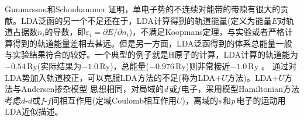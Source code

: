 {Gunnarsson和Schonhammer%
证明，单电子势的不连续对能带的带隙有很大的贡献。LDA泛函的另一个不足还在于，LDA计算得到的轨道能量(定义为能量$E$对轨道占据数$n_i$的导数，即$\varepsilon_i=\partial E/\partial n_i$)，不满足\textrm{Koopmans}定理\cite{Physica1-104_1933}，与实验或者严格计算得到的轨道能量差相去甚远。但是另一方面，LDA泛函得到的体系总能量一般与实验结果符合的较好。一个典型的例子就是\textrm{H}原子的计算，LDA计算的轨道能为$-0.54\,\mathrm{Ry}$(实际结果为$-1.0\,\mathrm{Ry}$)，总能量($-0.976\,\mathrm{Ry}$)则非常接近$-1.0\,\mathrm{Ry}$%
。%
通过对LDA势加入轨道校正，可以克服LDA方法的不足(称为LDA+$U$方法)。LDA+$U$方法与\textrm{Andersen}掺杂模型%
思想相同，对局域的{\textit d}\,或{\textit f}\,电子，采用模型Hamiltonian方法考虑$d$-$d$或$f$-$f$间相互作用(定域Coulomb相互作用$U$)，离域的{\textit s}\,和{\textit p}\,电子的运动用LDA近似描述。

}
